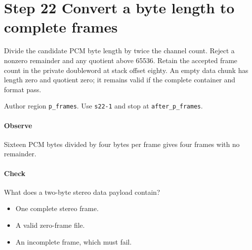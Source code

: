 \section{Step 22 Convert a byte length to complete frames}\label{pcm-wav-s22}
Divide the candidate PCM byte length by twice the channel count. Reject a nonzero remainder and any quotient above 65536. Retain the accepted frame count in the private doubleword at stack offset eighty. An empty data chunk has length zero and quotient zero; it remains valid if the complete container and format pass.

Author region \texttt{p\_frames}. Use \texttt{s22-1} and stop at \texttt{after\_p\_frames}.

\paragraph{Observe} Sixteen PCM bytes divided by four bytes per frame gives four frames with no remainder.

\paragraph{Check} What does a two-byte stereo data payload contain?
\begin{itemize}
  \item[A.] One complete stereo frame.
  \item[B.] A valid zero-frame file.
  \item[C.] An incomplete frame, which must fail.
\end{itemize}
